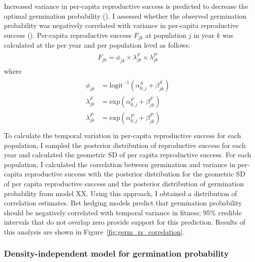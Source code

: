 \documentclass[12pt, oneside, titlepage]{article}   	%
\begin{document}
Increased variance in per-capita reproductive success is predicted to decrease the optimal germination probability (\cite{cohen1966,ellner1985a}). I assessed whether the observed germination probability was negatively correlated with variance in per-capita reproductive success (\cite{venable2007}). Per-capita reproductive success $F_{jk}$ at population $j$ in year $k$ was calculated at the per year and per population level as follows:
%
\begin{align}
  \begin{split}
F_{jk} = \phi_{jk} \times \lambda^F_{jk} \times \lambda^P_{jk} \label{eq:percapitars}
  \end{split}
\end{align}
%
where
%
\begin{align}
  \begin{split}
\phi_{jk} & = \mathrm{logit}^{-1}(\alpha^S_{0,j} + \beta^S_{jk}) \\
\lambda^F_{jk} & = \mathrm{exp}(\alpha^F_{0,j} + \beta^F_{jk}) \\
\lambda^P_{jk} & = \mathrm{exp}(\alpha^P_{0,j} + \beta^P_{jk}) \\
  \end{split}
\end{align}
%
To calculate the temporal variation in per-capita reproductive success for each population, I sampled the posterior distribution of reproductive success for each year and calculated the geometric SD of per capita reproductive success. For each population, I calculated the correlation between germination and variance in per-capita reproductive success with the posterior distribution for the geometric SD of per capita reproductive success and the posterior distribution of germination probability from model XX. Using this approach, I obtained a distribution of correlation estimates. Bet hedging models predict that germination probability should be negatively correlated with temporal variance in fitness; 95\% credible intervals that do not overlap zero provide support for this prediction. Results of this analysis are shown in Figure~\ref{fig:germ_rs_correlation}.

\subsubsection*{Density-independent model for germination probability}
\end{document}

